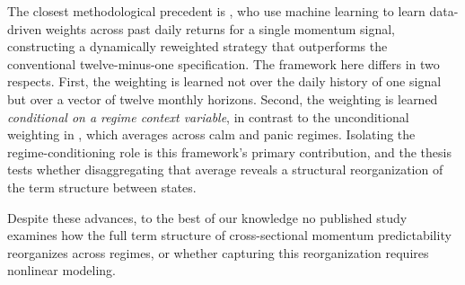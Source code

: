 The closest methodological precedent is \citet{BeckmeyerWiedemann2025}, who use machine learning to learn data-driven weights across past daily returns for a single momentum signal, constructing a dynamically reweighted strategy that outperforms the conventional twelve-minus-one specification. The framework here differs in two respects. First, the weighting is learned not over the daily history of one signal but over a vector of twelve monthly horizons. Second, the weighting is learned \emph{conditional on a regime context variable}, in contrast to the unconditional weighting in \citet{BeckmeyerWiedemann2025}, which averages across calm and panic regimes. Isolating the regime-conditioning role is this framework's primary contribution, and the thesis tests whether disaggregating that average reveals a structural reorganization of the term structure between states.

Despite these advances, to the best of our knowledge no published study examines how the full term structure of cross-sectional momentum predictability reorganizes across regimes, or whether capturing this reorganization requires nonlinear modeling.






